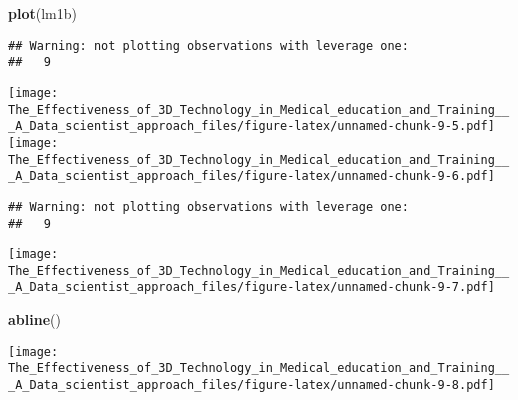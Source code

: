 \documentclass[]{article}
\newenvironment{Shaded}{\begin{snugshade}}{\end{snugshade}}
\newcommand{\DataTypeTok}[1]{\textcolor[rgb]{0.13,0.29,0.53}{#1}}
\newcommand{\KeywordTok}[1]{\textcolor[rgb]{0.13,0.29,0.53}{\textbf{#1}}}
\newcommand{\NormalTok}[1]{#1}
\newcommand{\OperatorTok}[1]{\textcolor[rgb]{0.81,0.36,0.00}{\textbf{#1}}}
\newcommand{\StringTok}[1]{\textcolor[rgb]{0.31,0.60,0.02}{#1}}
\begin{document}
\begin{Shaded}
\begin{Highlighting}[]
\KeywordTok{plot}\NormalTok{(lm1b)}
\end{Highlighting}
\end{Shaded}

\begin{verbatim}
## Warning: not plotting observations with leverage one:
##   9
\end{verbatim}

\texttt{[image: The\_Effectiveness\_of\_3D\_Technology\_in\_Medical\_education\_and\_Training\_\_\_A\_Data\_scientist\_approach\_files/figure-latex/unnamed-chunk-9-5.pdf]}
\texttt{[image: The\_Effectiveness\_of\_3D\_Technology\_in\_Medical\_education\_and\_Training\_\_\_A\_Data\_scientist\_approach\_files/figure-latex/unnamed-chunk-9-6.pdf]}

\begin{verbatim}
## Warning: not plotting observations with leverage one:
##   9
\end{verbatim}

\texttt{[image: The\_Effectiveness\_of\_3D\_Technology\_in\_Medical\_education\_and\_Training\_\_\_A\_Data\_scientist\_approach\_files/figure-latex/unnamed-chunk-9-7.pdf]}

\begin{Shaded}
\begin{Highlighting}[]
\KeywordTok{abline}\NormalTok{()}
\end{Highlighting}
\end{Shaded}

\texttt{[image: The\_Effectiveness\_of\_3D\_Technology\_in\_Medical\_education\_and\_Training\_\_\_A\_Data\_scientist\_approach\_files/figure-latex/unnamed-chunk-9-8.pdf]}

\begin{Shaded}
\end{Shaded}
\end{document}

